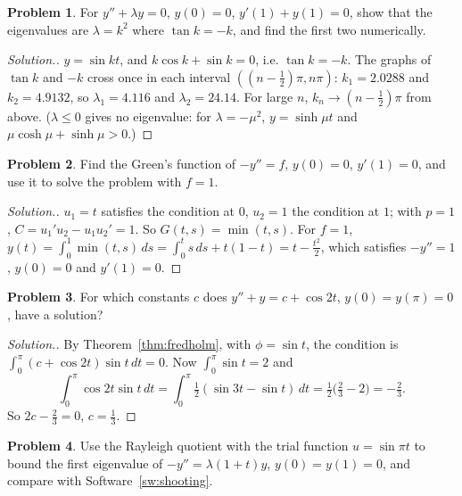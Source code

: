 \documentclass[11pt,a4paper]{article}
\numberwithin{equation}{section}
\theoremstyle{definition}
\newtheorem{problemx}{Problem}[subsection]
\newenvironment{problem}{\begin{problemx}}{\end{problemx}}
\newenvironment{solution}
  {\renewcommand{\qedsymbol}{}\begin{proof}[\textit{Solution}.]}
  {\end{proof}}
\begin{document}
\begin{problem}
For $y'' + \lambda y = 0$, $y(0) = 0$, $y'(1) + y(1) = 0$, show that the eigenvalues are $\lambda = k^2$ where $\tan k = -k$, and find the first two numerically.
\end{problem}

\begin{solution}
$y = \sin kt$, and $k\cos k + \sin k = 0$, i.e. $\tan k = -k$. The graphs of $\tan k$ and $-k$ cross once in each interval $((n - \frac12)\pi, n\pi)$: $k_1 = 2.0288$ and $k_2 = 4.9132$, so $\lambda_1 = 4.116$ and $\lambda_2 = 24.14$.
For large $n$, $k_n \to (n - \frac12)\pi$ from above. ($\lambda \leq 0$ gives no eigenvalue: for $\lambda = -\mu^2$, $y = \sinh\mu t$ and $\mu\cosh\mu + \sinh\mu > 0$.)
\end{solution}

\begin{problem}
Find the Green's function of $-y'' = f$, $y(0) = 0$, $y'(1) = 0$, and use it to solve the problem with $f = 1$.
\end{problem}

\begin{solution}
$u_1 = t$ satisfies the condition at $0$, $u_2 = 1$ the condition at $1$; with $p = 1$, $C = u_1'u_2 - u_1u_2' = 1$. So $G(t, s) = \min(t, s)$. For $f = 1$, $y(t) = \int_0^1\min(t, s)\,ds = \int_0^ts\,ds + t(1 - t) = t - \frac{t^2}{2}$, which
satisfies $-y'' = 1$, $y(0) = 0$ and $y'(1) = 0$.
\end{solution}

\begin{problem}
For which constants $c$ does $y'' + y = c + \cos2t$, $y(0) = y(\pi) = 0$, have a solution?
\end{problem}

\begin{solution}
By Theorem~\ref{thm:fredholm}, with $\phi = \sin t$, the condition is $\int_0^\pi(c + \cos2t)\sin t\,dt = 0$. Now $\int_0^\pi\sin t = 2$ and
\[
\int_0^\pi\cos2t\sin t\,dt = \int_0^\pi\tfrac12(\sin3t - \sin t)\,dt = \tfrac12\bigl(\tfrac23 - 2\bigr) = -\tfrac23 .
\]
So $2c - \frac23 = 0$, $c = \frac13$.
\end{solution}

\begin{problem}
Use the Rayleigh quotient with the trial function $u = \sin\pi t$ to bound the first eigenvalue of $-y'' = \lambda(1 + t)y$, $y(0) = y(1) = 0$, and compare with Software~\ref{sw:shooting}.
\end{problem}
\end{document}
